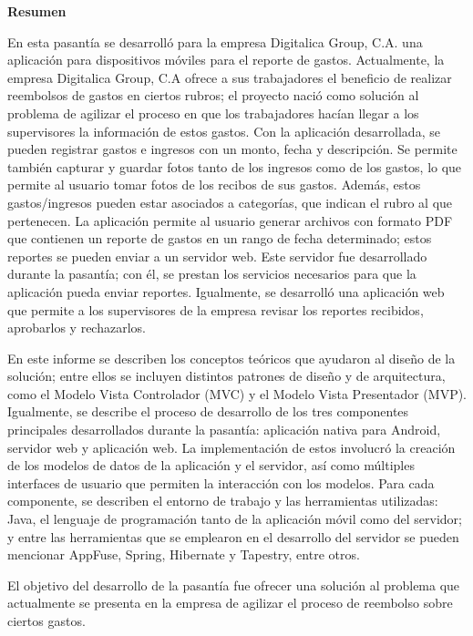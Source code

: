 \setcounter{page}{3}
\begin{center}
	{\bf Resumen}  %
\end{center}	

En esta pasantía se desarrolló para la empresa Digitalica Group, C.A. una aplicación para dispositivos móviles para el reporte de gastos. Actualmente, la empresa Digitalica Group, C.A ofrece a sus trabajadores el beneficio de realizar reembolsos de gastos en ciertos rubros; el proyecto nació como solución al problema de agilizar el proceso en que los trabajadores hacían llegar a los supervisores la información de estos gastos. Con la aplicación desarrollada, se pueden registrar gastos e ingresos con un monto, fecha y descripción. Se permite también capturar y guardar fotos tanto de los ingresos como de los gastos, lo que permite al usuario tomar fotos de los recibos de sus gastos. Además, estos gastos/ingresos pueden estar asociados a categorías, que indican el rubro al que pertenecen. La aplicación permite al usuario generar archivos con formato PDF que contienen un reporte de gastos en un rango de fecha determinado; estos reportes se pueden enviar a un servidor web. Este servidor fue desarrollado durante la pasantía; con él, se prestan los servicios necesarios para que la aplicación pueda enviar reportes. Igualmente, se desarrolló una aplicación web que permite a los supervisores de la empresa revisar los reportes recibidos, aprobarlos y rechazarlos.

En este informe se describen los conceptos teóricos que ayudaron al diseño de la solución; entre ellos se incluyen distintos patrones de diseño y de arquitectura, como el Modelo Vista Controlador (MVC) y el Modelo Vista Presentador (MVP). Igualmente, se describe el proceso de desarrollo de los tres componentes principales desarrollados durante la pasantía: aplicación nativa para Android, servidor web y aplicación web. La implementación de estos involucró la creación de los modelos de datos de la aplicación y el servidor, así como múltiples interfaces de usuario que permiten la interacción con los modelos. Para cada componente, se describen el entorno de trabajo y las herramientas utilizadas: Java, el lenguaje de programación tanto de la aplicación móvil como del servidor; y entre las herramientas que se emplearon en el desarrollo del servidor se pueden mencionar AppFuse, Spring, Hibernate y Tapestry, entre otros.

El objetivo del desarrollo de la pasantía fue ofrecer una solución al problema que actualmente se presenta en la empresa de agilizar el proceso de reembolso sobre ciertos gastos.


